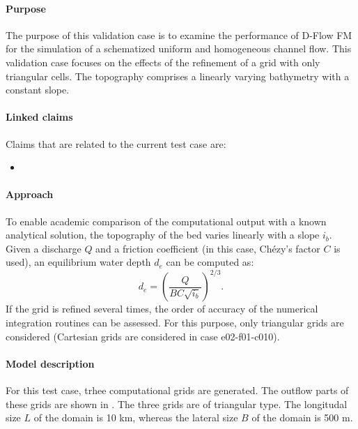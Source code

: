 

\paragraph*{Purpose}
The purpose of this validation case is to examine the performance of D-Flow FM for the simulation of a schematized uniform and homogeneous channel flow. This validation case focuses on the effects of the refinement of a grid with only triangular cells. The topography comprises a linearly varying bathymetry with a constant slope. 

\paragraph*{Linked claims}
Claims that are related to the current test case are:
\begin{itemize}
\item {}
\end{itemize}


\paragraph*{Approach}
To enable academic comparison of the computational output with a known analytical solution, the topography of the bed varies linearly with a slope $i_b$. Given a discharge $Q$ and a friction coefficient (in this case, Ch\'ezy's factor $C$ is used), an equilibrium water depth $d_e$ can be computed as:
\begin{equation}\label{eq:chezytriangleseqdepth}
d_e = \left(\frac{Q}{B C \sqrt{i_b}}\right)^{2/3}.
\end{equation}
If the grid is refined several times, the order of accuracy of the numerical integration routines can be assessed. For this purpose, only triangular grids are considered (Cartesian grids are considered in case e02-f01-c010).



\paragraph*{Model description}
For this test case, trhee computational grids are generated. The outflow parts of these grids are shown in . The three grids are of triangular type. The longitudal size $L$ of the domain is 10 km, whereas the lateral size $B$ of the domain is 500 m. 


